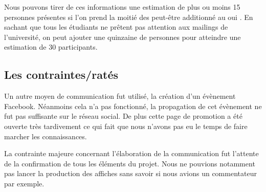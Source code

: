 Nous pouvons tirer de ces informations une estimation de plus ou moins 15 personnes présentes si l’on prend
la moitié des \og peut-être \fg{} additionné au \og oui \fg{}.
En sachant que tous les étudiants ne prêtent pas attention aux mailings de l’université, on peut ajouter
une quinzaine de personnes pour atteindre une estimation de 30 participants.

\newpage
\subsection{Les contraintes/ratés}%
\label{sub:les_contraintes_rates}

Un autre moyen de communication fut utilisé, la création d'un évènement
Facebook. Néanmoins cela n'a pas fonctionné, la propagation de cet
évènement ne fut pas suffisante sur le réseau social. De plus cette page
de promotion a été ouverte très tardivement ce qui fait que nous
n'avons pas eu le temps de faire marcher les connaissances.

La contrainte majeure concernant l'élaboration de la communication fut l'attente
de la confirmation de tous les éléments du projet. Nous ne pouvions
notamment pas lancer la production des affiches sans savoir si nous
avions un commentateur par exemple.


